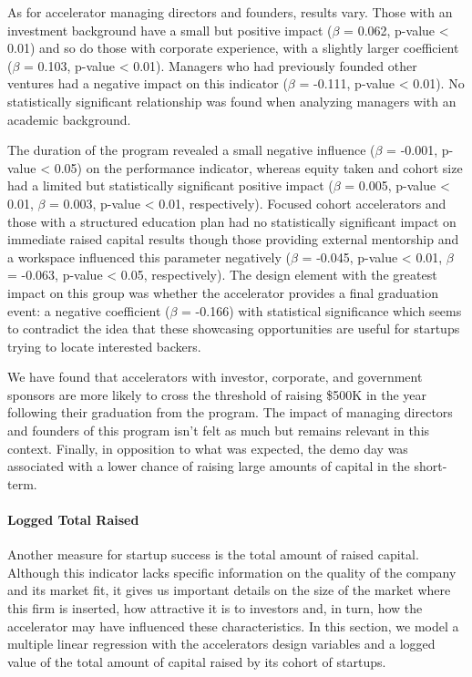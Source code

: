 \documentclass[
  12pt,
]{article}
\begin{document}
As for accelerator managing directors and founders, results vary. Those with an investment background have a small but positive impact (\(\beta\) = 0.062, p-value \textless{} 0.01) and so do those with corporate experience, with a slightly larger coefficient (\(\beta\) = 0.103, p-value \textless{} 0.01). Managers who had previously founded other ventures had a negative impact on this indicator (\(\beta\) = -0.111, p-value \textless{} 0.01). No statistically significant relationship was found when analyzing managers with an academic background.

The duration of the program revealed a small negative influence (\(\beta\) = -0.001, p-value \textless{} 0.05) on the performance indicator, whereas equity taken and cohort size had a limited but statistically significant positive impact (\(\beta\) = 0.005, p-value \textless{} 0.01, \(\beta\) = 0.003, p-value \textless{} 0.01, respectively). Focused cohort accelerators and those with a structured education plan had no statistically significant impact on immediate raised capital results though those providing external mentorship and a workspace influenced this parameter negatively (\(\beta\) = -0.045, p-value \textless{} 0.01, \(\beta\) = -0.063, p-value \textless{} 0.05, respectively). The design element with the greatest impact on this group was whether the accelerator provides a final graduation event: a negative coefficient (\(\beta\) = -0.166) with statistical significance which seems to contradict the idea that these showcasing opportunities are useful for startups trying to locate interested backers.

We have found that accelerators with investor, corporate, and government sponsors are more likely to cross the threshold of raising \$500K in the year following their graduation from the program. The impact of managing directors and founders of this program isn't felt as much but remains relevant in this context. Finally, in opposition to what was expected, the demo day was associated with a lower chance of raising large amounts of capital in the short-term.

\hypertarget{logged-total-raised}{%
\paragraph{Logged Total Raised}\label{logged-total-raised}}

Another measure for startup success is the total amount of raised capital. Although this indicator lacks specific information on the quality of the company and its market fit, it gives us important details on the size of the market where this firm is inserted, how attractive it is to investors and, in turn, how the accelerator may have influenced these characteristics. In this section, we model a multiple linear regression with the accelerators design variables and a logged value of the total amount of capital raised by its cohort of startups.
\end{document}
